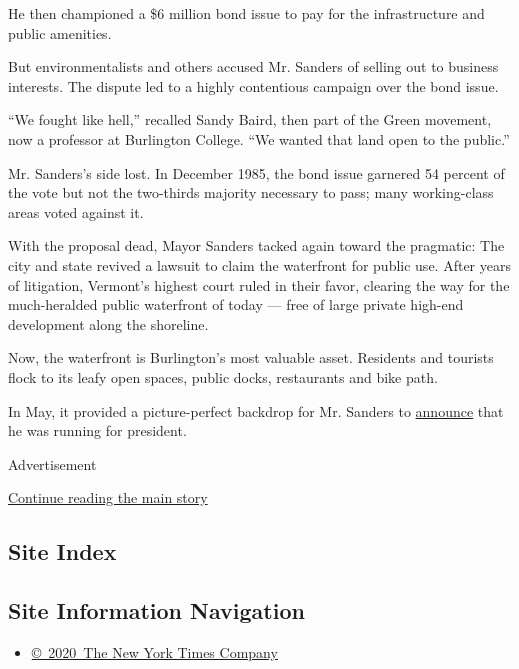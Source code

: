 He then championed a \$6 million bond issue to pay for the
infrastructure and public amenities.

But environmentalists and others accused Mr. Sanders of selling out to
business interests. The dispute led to a highly contentious campaign
over the bond issue.

``We fought like hell,'' recalled Sandy Baird, then part of the Green
movement, now a professor at Burlington College. ``We wanted that land
open to the public.''

Mr. Sanders's side lost. In December 1985, the bond issue garnered 54
percent of the vote but not the two-thirds majority necessary to pass;
many working-class areas voted against it.

With the proposal dead, Mayor Sanders tacked again toward the pragmatic:
The city and state revived a lawsuit to claim the waterfront for public
use. After years of litigation, Vermont's highest court ruled in their
favor, clearing the way for the much-heralded public waterfront of today
--- free of large private high-end development along the shoreline.

Now, the waterfront is Burlington's most valuable asset. Residents and
tourists flock to its leafy open spaces, public docks, restaurants and
bike path.

In May, it provided a picture-perfect backdrop for Mr. Sanders to
\href{https://berniesanders.com/bernies-announcement/}{announce} that he
was running for president.

Advertisement

\protect\hyperlink{after-bottom}{Continue reading the main story}

\hypertarget{site-index}{%
\subsection{Site Index}\label{site-index}}

\hypertarget{site-information-navigation}{%
\subsection{Site Information
Navigation}\label{site-information-navigation}}

\begin{itemize}
\tightlist
\item
  \href{https://help.nytimes3xbfgragh.onion/hc/en-us/articles/115014792127-Copyright-notice}{©~2020~The
  New York Times Company}
\end{itemize}

